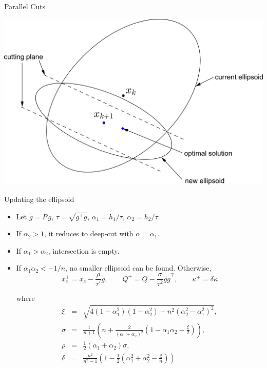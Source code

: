 \documentclass[10pt,ignorenonframetext,serif,onlymath]{beamer}
\begin{document}
\begin{frame}{Parallel Cuts}
\protect\hypertarget{sec:parallel-cuts-1}{}

\includegraphics{ellipsoid.files/parallel_cut.pdf}

\end{frame}

\begin{frame}{Updating the ellipsoid}
\protect\hypertarget{sec:updating-the-ellipsoid}{}

\begin{itemize}
\item
  Let \(\tilde{g} = P\,g\), \(\tau = \sqrt{g^\top\tilde{g}}\),
  \(\alpha_1 = h_1/\tau\), \(\alpha_2 = h_2/\tau\).
\item
  If \(\alpha_2 > 1\), it reduces to deep-cut with
  \(\alpha = \alpha_1\).
\item
  If \(\alpha_1 > \alpha_2\), intersection is empty.
\item
  If \(\alpha_1 \alpha_2 < -1/n\), no smaller ellipsoid can be found.
  Otherwise, \[x_c^+ = x_c - \frac{\rho}{\tau'} \tilde{g}, \qquad
  Q^+ = Q - \frac{\sigma}{\tau^2} \tilde{g}\tilde{g}^\top, \qquad
  \kappa^+ =  \delta \kappa
   \]

  where \[\begin{array}{lll}
    \xi &=& \sqrt{4(1 - \alpha_1^2)(1 - \alpha_2^2) + n^2(\alpha_2^2 - \alpha_1^2)^2}, \\
    \sigma &=& \frac{1}{n+1}(n + \frac{2}{(\alpha_1 + \alpha_2)^2}(1 - \alpha_1\alpha_2 - \frac{\xi}{2})), \\
    \rho &=& \frac{1}{2}(\alpha_1 + \alpha_2) \sigma, \\
    \delta &=& \frac{n^2}{n^2-1} (1 - \frac{1}{2}(\alpha_1^2 + \alpha_2^2 - \frac{\xi}{n}))
   \end{array}\]
\end{itemize}

\end{frame}
\end{document}
